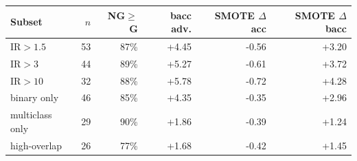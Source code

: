 \begin{tabular}{lrrrrr}
\toprule
Subset & $n$ & NG$\ge$G & bacc adv. & SMOTE $\Delta$acc & SMOTE $\Delta$bacc \\
\midrule
$\mathrm{IR}>1.5$ & 53 & 87\% & +4.45 & -0.56 & +3.20 \\
$\mathrm{IR}>3$ & 44 & 89\% & +5.27 & -0.61 & +3.72 \\
$\mathrm{IR}>10$ & 32 & 88\% & +5.78 & -0.72 & +4.28 \\
binary only & 46 & 85\% & +4.35 & -0.35 & +2.96 \\
multiclass only & 29 & 90\% & +1.86 & -0.39 & +1.24 \\
high-overlap & 26 & 77\% & +1.68 & -0.42 & +1.45 \\
\bottomrule
\end{tabular}
